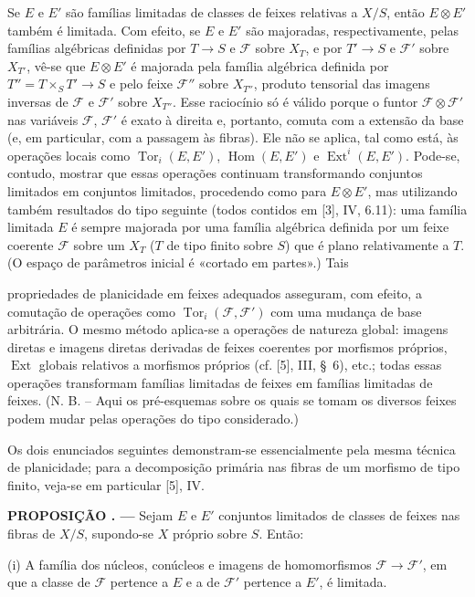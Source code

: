 \documentclass[11pt,twoside,openany]{book}
\numberwithin{equation}{section}
\newcommand{\src}[1]{%
  \phantomsection\hypertarget{src:#1}{}%
  \marginpar{\raggedleft\footnotesize\sffamily #1}%
}
\theoremstyle{plain}
\theoremstyle{definition}
\theoremstyle{remark}
\newcommand{\result}[2]{%
  \par\medskip\noindent\textbf{#1%
  \if\relax\detokenize{#2}\relax\else\space#2\fi. ---}\enspace
}
\newcommand{\FgaUnitKey}{frontmatter}
\renewcommand{\src}[1]{%
  \phantomsection\hypertarget{src:\FgaUnitKey:#1}{}%
  \marginpar{\raggedleft\footnotesize\sffamily #1}%
}
\begin{document}
Se $E$ e $E'$ são famílias limitadas de classes de feixes relativas a $X/S$,
então $E\otimes E'$ também é limitada. Com efeito, se $E$ e $E'$ são majoradas,
respectivamente, pelas famílias algébricas definidas por $T\longrightarrow S$ e
$\mathcal F$ sobre $X_T$, e por $T'\longrightarrow S$ e $\mathcal F'$ sobre
$X_{T'}$, vê-se que $E\otimes E'$ é majorada pela família algébrica definida por
$T''=T\times_S T'\longrightarrow S$ e pelo feixe $\mathcal F''$ sobre
$X_{T''}$, produto tensorial das imagens inversas de $\mathcal F$ e
$\mathcal F'$ sobre $X_{T''}$. Esse raciocínio só é válido porque o funtor
$\mathcal F\otimes\mathcal F'$ nas variáveis $\mathcal F$, $\mathcal F'$ é exato
à direita e, portanto, comuta com a extensão da base (e, em particular, com a
passagem às fibras). Ele não se aplica, tal como está, às operações locais como
$\operatorname{Tor}_i(E,E')$, $\operatorname{Hom}(E,E')$ e
$\operatorname{Ext}^i(E,E')$. Pode-se, contudo, mostrar que essas operações
continuam transformando conjuntos limitados em conjuntos limitados, procedendo
como para $E\otimes E'$, mas utilizando também resultados do tipo seguinte
(todos contidos em [3], IV, 6.11): uma família limitada $E$ é sempre majorada
por uma família algébrica definida por um feixe coerente $\mathcal F$ sobre um
$X_T$ ($T$ de tipo finito sobre $S$) que é plano relativamente a $T$. (O espaço
de parâmetros inicial é «cortado em partes».) Tais
\src{252}
propriedades de planicidade em feixes adequados asseguram, com efeito, a
comutação de operações como $\operatorname{Tor}_i(\mathcal F,\mathcal F')$
com uma mudança de base arbitrária. O mesmo método aplica-se a operações de
natureza global: imagens diretas e imagens diretas derivadas de feixes
coerentes por morfismos próprios, $\operatorname{Ext}$ globais relativos a
morfismos próprios (cf. [5], III, \S~6), etc.; todas essas operações
transformam famílias limitadas de feixes em famílias limitadas de feixes.
(N. B. -- Aqui os pré-esquemas sobre os quais se tomam os diversos feixes
podem mudar pelas operações do tipo considerado.)

Os dois enunciados seguintes demonstram-se essencialmente pela mesma técnica
de planicidade; para a decomposição primária nas fibras de um morfismo de tipo
finito, veja-se em particular [5], IV.

\result{PROPOSIÇÃO}{1.2} Sejam $E$ e $E'$ conjuntos limitados de classes de
feixes nas fibras de $X/S$, supondo-se $X$ próprio sobre $S$. Então:

\medskip
\noindent (i) A família dos núcleos, conúcleos e imagens de homomorfismos
$\mathcal F\longrightarrow\mathcal F'$, em que a classe de $\mathcal F$
pertence a $E$ e a de $\mathcal F'$ pertence a $E'$, é limitada.
\end{document}
